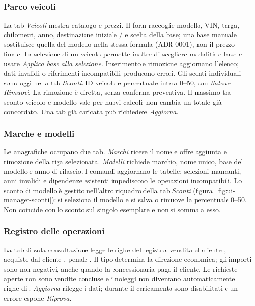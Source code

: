 \subsubsection{Parco veicoli}
La tab \emph{Veicoli} mostra catalogo e prezzi. Il form raccoglie modello,
VIN, targa, chilometri, anno, destinazione iniziale / e scelta della base; una base manuale sostituisce
quella del modello nella stessa formula (ADR 0001), non il prezzo finale.
La selezione di un veicolo permette inoltre di scegliere modalità e base e usare \emph{Applica base alla selezione}. Inserimento e rimozione aggiornano l'elenco; dati invalidi o riferimenti
incompatibili producono errori. Gli sconti individuali sono oggi nella tab
\emph{Sconti}: ID veicolo e percentuale intera 0--50, con \emph{Salva} e
\emph{Rimuovi}. La rimozione è diretta, senza conferma preventiva.
Il massimo tra sconto veicolo e modello vale per nuovi calcoli; non cambia
un totale già concordato. Una tab già caricata può richiedere \emph{Aggiorna}.
\clearpage

\subsubsection{Marche e modelli}
Le anagrafiche occupano due tab. \emph{Marchi} riceve il nome e offre
aggiunta e rimozione della riga selezionata. \emph{Modelli} richiede marchio,
nome unico, base del modello e anno di rilascio. I comandi aggiornano le
tabelle; selezioni mancanti, anni invalidi e dipendenze esistenti impediscono
le operazioni incompatibili. Lo sconto di modello è gestito nell'altro
riquadro della tab \emph{Sconti} (figura~\ref{fig:ui-manager-sconti}): si
seleziona il modello e si salva o rimuove la percentuale 0--50. Non coincide
con lo sconto sul singolo esemplare e non si somma a esso.
\clearpage

\subsubsection{Registro delle operazioni}
La tab di sola consultazione legge le righe del registro: vendita al
cliente , acquisto dal cliente , penale
. Il tipo determina la direzione economica; gli importi sono
non negativi, anche quando la concessionaria paga il cliente. Le richieste
aperte non sono vendite concluse e i noleggi non diventano automaticamente
righe di . \emph{Aggiorna} rilegge i dati; durante il caricamento
sono disabilitati e un errore espone \emph{Riprova}.

